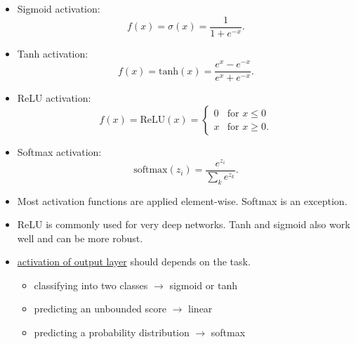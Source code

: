 \documentclass[twocolumn,landscape,10pt]{article}
\theoremstyle{definition}
\begin{document}
\begin{itemize}
    \item Sigmoid activation:
        \[
            f(x) = \sigma(x) = \frac{1}{1 + e^{-x}}.
        \]
    \item Tanh activation:
        \[
            f(x) = \text{tanh}(x) = \frac{e^{x}-e^{-x}}{e^{x}+e^{-x}}.
        \]
    \item ReLU activation:
        \[
            f(x)=\text{ReLU}(x)=\begin{cases}
                0 & \text{for } x\le 0 \\
                x & \text{for } x\ge 0.
            \end{cases} 
        \]
    \item Softmax activation:
        \[
            \text{softmax}(z_i)=\frac{e^{z_i}}{\sum_ke^{z_k}}.
        \]
    \item Most activation functions are applied element-wise. Softmax is an
        exception.
    \item ReLU is commonly used for very deep networks. Tanh and sigmoid also
        work well and can be more robust.
    \item \underline{activation of output layer} should depends on the task.
        \begin{itemize}
            \item classifying into two classes $\rightarrow$ sigmoid or tanh
            \item predicting an unbounded score $\rightarrow$ linear
            \item predicting a probability distribution $\rightarrow$ softmax
        \end{itemize} 
\end{itemize} 
\end{document}
